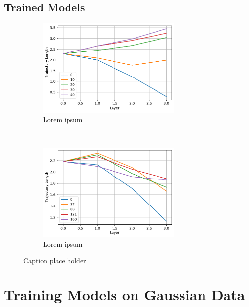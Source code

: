 \subsection{Trained Models}\label{sec:Trained Models}
\begin{figure}[H]
    \centering
    \begin{subfigure}[t]{0.5\textwidth}
        \centering
        \includegraphics[height=1.9in]{latex/figures/TL_trained.pdf}
        \caption{Lorem ipsum}
        
    \end{subfigure}%
    ~ 
    \begin{subfigure}[t]{0.5\textwidth}
        \centering
        \includegraphics[height=1.9in]{latex/figures/TL_trained_DNN.pdf}
        \caption{Lorem ipsum}
    \end{subfigure}
    \caption{Caption place holder}
    \label{fig:FIM Comparison}
\end{figure}



\section{Training Models on Gaussian Data}\label{sec:Training Models}

